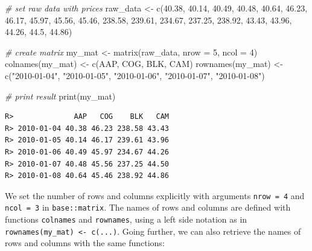 \documentclass[
  12pt,
]{book}
\newenvironment{Shaded}{\begin{snugshade}}{\end{snugshade}}
\newcommand{\AttributeTok}[1]{\textcolor[rgb]{0.61,0.61,0.61}{#1}}
\newcommand{\CommentTok}[1]{\textcolor[rgb]{0.37,0.37,0.37}{\textit{#1}}}
\newcommand{\DecValTok}[1]{\textcolor[rgb]{0.06,0.06,0.06}{#1}}
\newcommand{\FloatTok}[1]{\textcolor[rgb]{0.06,0.06,0.06}{#1}}
\newcommand{\FunctionTok}[1]{\textcolor[rgb]{0,0,0}{#1}}
\newcommand{\NormalTok}[1]{#1}
\newcommand{\OtherTok}[1]{\textcolor[rgb]{0.37,0.37,0.37}{#1}}
\newcommand{\StringTok}[1]{\textcolor[rgb]{0.5,0.5,0.5}{#1}}
\begin{document}
\begin{Shaded}
\begin{Highlighting}[]
\CommentTok{\# set raw data with prices }
\NormalTok{raw\_data }\OtherTok{\textless{}{-}} \FunctionTok{c}\NormalTok{(}\FloatTok{40.38}\NormalTok{,  }\FloatTok{40.14}\NormalTok{,  }\FloatTok{40.49}\NormalTok{,  }\FloatTok{40.48}\NormalTok{,  }\FloatTok{40.64}\NormalTok{,}
              \FloatTok{46.23}\NormalTok{,  }\FloatTok{46.17}\NormalTok{,  }\FloatTok{45.97}\NormalTok{,  }\FloatTok{45.56}\NormalTok{,  }\FloatTok{45.46}\NormalTok{,}
              \FloatTok{238.58}\NormalTok{, }\FloatTok{239.61}\NormalTok{, }\FloatTok{234.67}\NormalTok{, }\FloatTok{237.25}\NormalTok{, }\FloatTok{238.92}\NormalTok{,}
              \FloatTok{43.43}\NormalTok{,  }\FloatTok{43.96}\NormalTok{,  }\FloatTok{44.26}\NormalTok{,  }\FloatTok{44.5}\NormalTok{,   }\FloatTok{44.86}\NormalTok{)}

\CommentTok{\# create matrix          }
\NormalTok{my\_mat }\OtherTok{\textless{}{-}} \FunctionTok{matrix}\NormalTok{(raw\_data, }\AttributeTok{nrow =} \DecValTok{5}\NormalTok{, }\AttributeTok{ncol =} \DecValTok{4}\NormalTok{)}
\FunctionTok{colnames}\NormalTok{(my\_mat) }\OtherTok{\textless{}{-}} \FunctionTok{c}\NormalTok{(}\StringTok{\textquotesingle{}AAP\textquotesingle{}}\NormalTok{, }\StringTok{\textquotesingle{}COG\textquotesingle{}}\NormalTok{, }\StringTok{\textquotesingle{}BLK\textquotesingle{}}\NormalTok{, }\StringTok{\textquotesingle{}CAM\textquotesingle{}}\NormalTok{)}
\FunctionTok{rownames}\NormalTok{(my\_mat) }\OtherTok{\textless{}{-}} \FunctionTok{c}\NormalTok{(}\StringTok{"2010{-}01{-}04"}\NormalTok{, }\StringTok{"2010{-}01{-}05"}\NormalTok{, }\StringTok{"2010{-}01{-}06"}\NormalTok{, }
                      \StringTok{"2010{-}01{-}07"}\NormalTok{, }\StringTok{"2010{-}01{-}08"}\NormalTok{)}

\CommentTok{\# print result}
\FunctionTok{print}\NormalTok{(my\_mat)}
\end{Highlighting}
\end{Shaded}

\begin{verbatim}
R>              AAP   COG    BLK   CAM
R> 2010-01-04 40.38 46.23 238.58 43.43
R> 2010-01-05 40.14 46.17 239.61 43.96
R> 2010-01-06 40.49 45.97 234.67 44.26
R> 2010-01-07 40.48 45.56 237.25 44.50
R> 2010-01-08 40.64 45.46 238.92 44.86
\end{verbatim}

We set the number of rows and columns explicitly with arguments \texttt{nrow\ =\ 4} and \texttt{ncol\ =\ 3} in \texttt{base::matrix}. The names of rows and columns are defined with functions \texttt{colnames} and \texttt{rownames}, using a left side notation as in \texttt{rownames(my\_mat)\ \textless{}-\ c(...)}. Going further, we can also retrieve the names of rows and columns with the same functions:  
\end{document}
